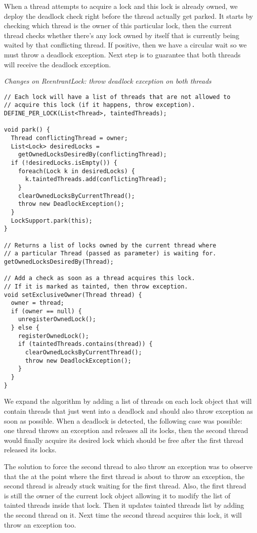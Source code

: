 When a thread attempts to acquire a lock and this lock is already owned, we deploy the deadlock check right before the thread actually get parked.
It starts by checking which thread is the owner of this particular lock, then the current thread checks whether there's any lock owned by itself
that is currently being waited by that conflicting thread. If positive, then we have a circular wait so we must throw a deadlock exception.
Next step is to guarantee that both threads will receive the deadlock exception.

\medskip
\noindent
{\it Changes on ReentrantLock: throw deadlock exception on both threads}
\begin{verbatim}
// Each lock will have a list of threads that are not allowed to
// acquire this lock (if it happens, throw exception).
DEFINE_PER_LOCK(List<Thread>, taintedThreads);

void park() {
  Thread conflictingThread = owner;
  List<Lock> desiredLocks =
    getOwnedLocksDesiredBy(conflictingThread);
  if (!desiredLocks.isEmpty()) {
    foreach(Lock k in desiredLocks) {
      k.taintedThreads.add(conflictingThread);
    }
    clearOwnedLocksByCurrentThread();
    throw new DeadlockException();
  }
  LockSupport.park(this);
}

// Returns a list of locks owned by the current thread where
// a particular Thread (passed as parameter) is waiting for.
getOwnedLocksDesiredBy(Thread);

// Add a check as soon as a thread acquires this lock.
// If it is marked as tainted, then throw exception.
void setExclusiveOwner(Thread thread) {
  owner = thread;
  if (owner == null) {
    unregisterOwnedLock();
  } else {
    registerOwnedLock();
    if (taintedThreads.contains(thread)) {
      clearOwnedLocksByCurrentThread();
      throw new DeadlockException();
    }
  }
}

\end{verbatim}

We expand the algorithm by adding a list of threads on each lock object that will contain threads that just went into a deadlock and should also throw exception as soon as possible.
When a deadlock is detected, the following case was possible: one thread throws an exception and releases all its locks, then the second thread would finally acquire its desired lock
which should be free after the first thread released its locks.

The solution to force the second thread to also throw an exception was to observe that the at the point where the first thread is about to throw an exception, the second thread
is already stuck waiting for the first thread. Also, the first thread is still the owner of the current lock object allowing it to modify the list of tainted threads inside that lock.
Then it updates tainted threads list by adding the second thread on it. Next time the second thread acquires this lock, it will throw an exception too.


